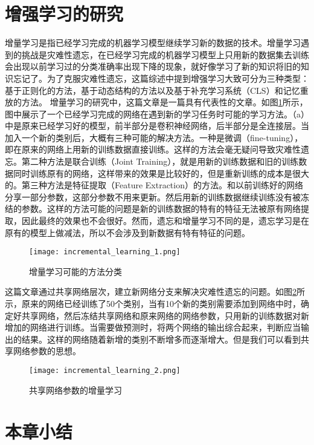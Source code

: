 \section{增强学习的研究}
增量学习\cite{PARISI201954}是指已经学习完成的机器学习模型继续学习新的数据的技术。增量学习遇到的挑战是灾难性遗忘，在已经学习完成的机器学习模型上只用新的数据集去训练会出现以前学习过的分类准确率出现下降的现象，就好像学习了新的知识将旧的知识忘记了。为了克服灾难性遗忘，这篇综述中提到增强学习大致可分为三种类型：基于正则化的方法，基于动态结构的方法以及基于补充学习系统（CLS）和记忆重放的方法。
增量学习的研究中，这篇文章\cite{8107520}是一篇具有代表性的文章。如图\ref{fig:incremental_learning_1}所示，图中展示了一个已经学习完成的网络在遇到新的学习任务时可能的学习方法。（a）中是原来已经学习好的模型，前半部分是卷积神经网络，后半部分是全连接层。当加入一个新的类别后，大概有三种可能的解决方法。一种是微调（fine-tuning），即在原来的网络上用新的训练数据直接训练。这样的方法会毫无疑问导致灾难性遗忘。第二种方法是联合训练（Joint Training），就是用新的训练数据和旧的训练数据同时训练原有的网络，这样带来的效果是比较好的，但是重新训练的成本是很大的。第三种方法是特征提取（Feature Extraction）的方法。和以前训练好的网络分享一部分参数，这部分参数不用来更新。然后用新的训练数据继续训练没有被冻结的参数。这样的方法可能的问题是新的训练数据的特有的特征无法被原有网络提取，因此最终的效果也不会很好。然而，遗忘和增量学习不同的是，遗忘学习是在原有的模型上做减法，所以不会涉及到新数据有特有特征的问题。
\begin{figure}
    \centering
    \texttt{[image: incremental\_learning\_1.png]}
    \caption{增量学习可能的方法分类}
    \label{fig:incremental_learning_1}
\end{figure}
这篇文章\cite{Sarwar_2020}通过共享网络层次，建立新网络分支来解决灾难性遗忘的问题。如图\ref{fig:incremental_learning_2}所示，原来的网络已经训练了50个类别，当有10个新的类别需要添加到网络中时，确定好共享网络，然后冻结共享网络和原来网络的网络参数，只用新的训练数据对新增加的网络进行训练。当需要做预测时，将两个网络的输出综合起来，判断应当输出的结果。这样的网络随着新增的类别不断增多而逐渐增大。但是我们可以看到共享网络参数的思想。
\begin{figure}
    \centering
    \texttt{[image: incremental\_learning\_2.png]}
    \caption{共享网络参数的增量学习}
    \label{fig:incremental_learning_2}
\end{figure}
\section{本章小结}
